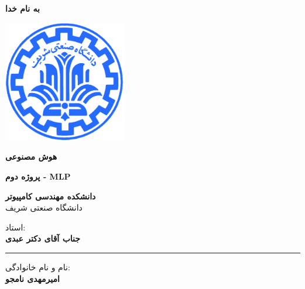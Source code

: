 \documentclass[12pt,titlepage,a4page , tikz , multi,table , svgnames,xcdraw]{article}
\begin{document}
\begin{titlepage}

 \begin{center}
        
       \vspace*{1cm}

 \vspace{1cm}
       \textbf{ \Huge{به نام خدا} }
       \vspace{0.4cm}
       
       \includegraphics[width=0.4\textwidth]{sharif1.png}
       
 	\vspace{0.7cm}
       \textbf{ \LARGE{هوش مصنوعی} }

 
   \vspace{0.7cm}
  \textbf{ \Large{ پروژه دوم - MLP} }
   \vspace{0.5cm}
       
 
      \large \textbf{دانشکده مهندسی کامپیوتر}\\\vspace{0.2cm}
    \large   دانشگاه صنعتی شریف\\\vspace{0.25cm}
      
استاد:\\
    \textbf{{جناب آقای دکتر عبدی}}

    \vspace{0.25cm}
    \noindent\rule[1ex]{\linewidth}{3pt}
    
    \vspace{0.5cm}
نام و نام خانوادگی:\\
    \textbf{{امیرمهدی نامجو}}
        \vspace{0.1cm}

\end{center}
\end{titlepage}

\newpage
\pagestyle{fancy}
\fancyhf{}
\fancyfoot{}

\cfoot{\thepage}
\end{document}
